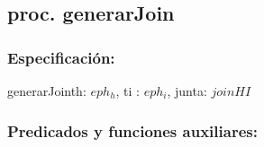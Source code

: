 \subsection{proc. generarJoin}
    \subsubsection{Especificaci\'on:}
        \begin{proc}{generarJoin}{\In th: $eph_{h}$, \In ti : $eph_{i}$, \Out junta:  $joinHI$}{}
        \end{proc}
    \subsubsection{Predicados y funciones auxiliares:}

